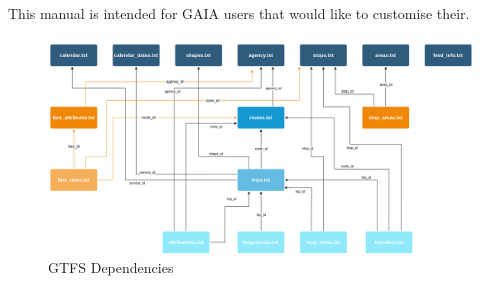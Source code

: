 \documentclass[12pt, a4paper]{book}
\begin{document}
\begin{justify}
This manual is intended for GAIA users that would like to customise their.
\end{justify}



\begin{figure}[h]
    \centering
    \includegraphics[width=1.0\textwidth]{GTFS Diagram}
    \caption{GTFS Dependencies}
    \label{fig:figure1}
\end{figure}

\end{document}
